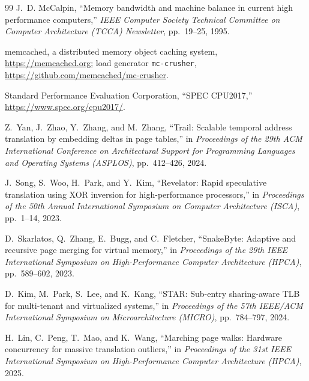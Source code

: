 \documentclass[11pt,a4paper]{article}
\begin{document}
\begin{thebibliography}{99}
J.~D. McCalpin,
\newblock ``Memory bandwidth and machine balance in current high performance computers,''
\newblock \textit{IEEE Computer Society Technical Committee on Computer Architecture (TCCA) Newsletter}, pp.~19--25, 1995.

memcached, a distributed memory object caching system, \url{https://memcached.org}; load generator \texttt{mc-crusher}, \url{https://github.com/memcached/mc-crusher}.

Standard Performance Evaluation Corporation, ``SPEC CPU2017,'' \url{https://www.spec.org/cpu2017/}.

Z.~Yan, J.~Zhao, Y.~Zhang, and M.~Zhang,
\newblock ``Trail: Scalable temporal address translation by embedding deltas in page tables,''
\newblock in \textit{Proceedings of the 29th ACM International Conference on Architectural Support for Programming Languages and Operating Systems (ASPLOS)}, pp.~412--426, 2024.

J.~Song, S.~Woo, H.~Park, and Y.~Kim,
\newblock ``Revelator: Rapid speculative translation using XOR inversion for high-performance processors,''
\newblock in \textit{Proceedings of the 50th Annual International Symposium on Computer Architecture (ISCA)}, pp.~1--14, 2023.

D.~Skarlatos, Q.~Zhang, E.~Bugg, and C.~Fletcher,
\newblock ``SnakeByte: Adaptive and recursive page merging for virtual memory,''
\newblock in \textit{Proceedings of the 29th IEEE International Symposium on High-Performance Computer Architecture (HPCA)}, pp.~589--602, 2023.

D.~Kim, M.~Park, S.~Lee, and K.~Kang,
\newblock ``STAR: Sub-entry sharing-aware TLB for multi-tenant and virtualized systems,''
\newblock in \textit{Proceedings of the 57th IEEE/ACM International Symposium on Microarchitecture (MICRO)}, pp.~784--797, 2024.

H.~Lin, C.~Peng, T.~Mao, and K.~Wang,
\newblock ``Marching page walks: Hardware concurrency for massive translation outliers,''
\newblock in \textit{Proceedings of the 31st IEEE International Symposium on High-Performance Computer Architecture (HPCA)}, 2025.

\end{thebibliography}
\end{document}
